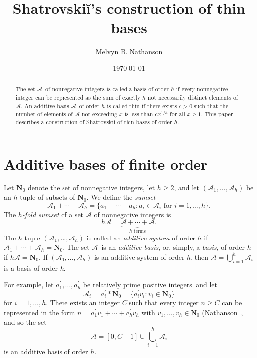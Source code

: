 \documentclass{amsart}
\title{Shatrovski\u{i}'s construction of thin bases}
\author{Melvyn B. Nathanson}
\date{\today}
\begin{document}
\maketitle

\begin{abstract}
The set {\ensuremath{ \mathcal A}}\ of nonnegative integers is called a basis of order $h$ if every nonnegative integer can be represented as the sum 
of exactly $h$ not necessarily distinct elements of {\ensuremath{ \mathcal A}}.  
An additive basis {\ensuremath{ \mathcal A}}\ of order $h$ is called thin if there exists $c > 0$ such that the number of elements of ${\ensuremath{ \mathcal A}}$ not exceeding $x$ is less than $c x^{1/h}$ for all $x \geq 1$.  
This paper describes a construction of Shatrovski\u{i} of thin bases of order $h$.
\end{abstract}

\section{Additive bases of finite order}
Let ${\ensuremath{ \mathbf N }}_0$ denote the set of nonnegative integers, let $h \geq 2$, and let $({\ensuremath{ \mathcal A}}_1,\ldots, {\ensuremath{ \mathcal A}}_h)$ be an $h$-tuple of subsets of ${\ensuremath{ \mathbf N }}_0$.  We define the \emph{sumset}
\[
{\ensuremath{ \mathcal A}}_1 + \cdots + {\ensuremath{ \mathcal A}}_h = \{a_1 + \cdots+ a_h : a_i \in {\ensuremath{ \mathcal A}}_i \text{ for } i = 1,\ldots, h\}.
\]
The \emph{$h$-fold sumset} of a set ${\ensuremath{ \mathcal A}}$ of nonnegative integers is 
\[
h{\ensuremath{ \mathcal A}} = \underbrace{{\ensuremath{ \mathcal A}}+ \cdots + {\ensuremath{ \mathcal A}}}_{h \text{ terms}} .
\]
The $h$-tuple $({\ensuremath{ \mathcal A}}_1,\ldots, {\ensuremath{ \mathcal A}}_h)$ is called an \emph{additive system} of order $h$ if ${\ensuremath{ \mathcal A}}_1 + \cdots + {\ensuremath{ \mathcal A}}_h = {\ensuremath{ \mathbf N }}_0.$
The set {\ensuremath{ \mathcal A}}\ is an \emph{additive basis}, or, simply, a \emph{basis},  of order $h$ if $h{\ensuremath{ \mathcal A}} = {\ensuremath{ \mathbf N }}_0.$  If $({\ensuremath{ \mathcal A}}_1,\ldots, {\ensuremath{ \mathcal A}}_h)$ is  an additive system of order $h$, then ${\ensuremath{ \mathcal A}} = \bigcup_{i=1}^h {\ensuremath{ \mathcal A}}_i$ is a basis of order $h$.  

For example, let $a^{\prime}_1,\ldots, a^{\prime}_h$ be relatively prime positive integers, and let
\[
{\ensuremath{ \mathcal A}}_i = a^{\prime}_i\ast {\ensuremath{ \mathbf N }}_0 = \{a^{\prime}_iv_i : v_i \in {\ensuremath{ \mathbf N }}_0\}
\]
for $i=1,\ldots, h$.  
There exists an integer $C$ such that every integer $n \geq C$ can be represented in the form $n = a^{\prime}_1v_1 + \cdots + a^{\prime}_hv_h$ with $v_1,\ldots, v_h \in {\ensuremath{ \mathbf N }}_0$ (Nathanson~\cite[Section 1.6]{nath00aa}, and so the set
\[
{\ensuremath{ \mathcal A}} = [0,C-1] \cup \bigcup_{i=1}^h {\ensuremath{ \mathcal A}}_i
\]
is an additive basis of order $h$.
\end{document}
